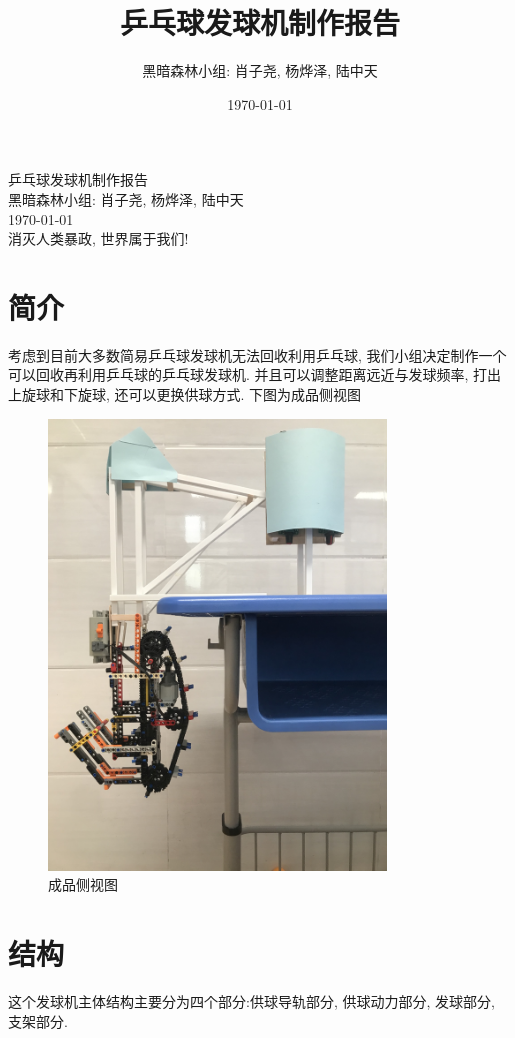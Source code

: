 \documentclass[UTF8]{ctexart}
\title{乒乓球发球机制作报告}
\author{黑暗森林小组: 肖子尧, 杨烨泽, 陆中天}
\date{\today}
\begin{document}
\vspace*{\fill}
\begin{center}
      {\Huge 乒乓球发球机制作报告}\\[0.5cm]
      {\Large 黑暗森林小组: 肖子尧, 杨烨泽, 陆中天}\\[0.4cm]
      {\today}\\[0.4cm]
      {消灭人类暴政, 世界属于我们!}
\end{center}
\vspace*{\fill}
\newpage
\tableofcontents
\newpage
\section{\Large 简介}
考虑到目前大多数简易乒乓球发球机无法回收利用乒乓球, 我们小组决定制作一个可以回收再利用乒乓球的乒乓球发球机. 并且可以调整距离远近与发球频率, 打出上旋球和下旋球, 还可以更换供球方式. 下图为成品侧视图
\begin{figure}[H]
\centering
\includegraphics[width=0.80\textwidth, angle=270]{machine.jpg}
\caption{成品侧视图}
\end{figure}
\section{\Large 结构}
这个发球机主体结构主要分为四个部分:供球导轨部分, 供球动力部分, 发球部分, 支架部分.
\end{document}
